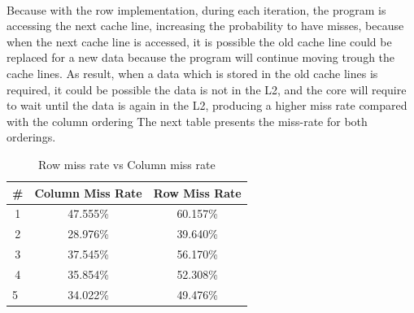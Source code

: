 \documentclass[xcolor=table]{llncs}
\begin{document}
\paragraph{}
Because with the row implementation, during each iteration, the program is accessing the next cache line, increasing the probability to have misses, because when the next cache line is accessed, it is possible the old cache line could be replaced for a new data because the program will continue moving trough the cache lines. As result, when a data which is stored in the old cache lines is required, it could be possible the data is not in the L2, and the core will require to wait until the data is again in the L2, producing a higher miss rate compared with the column ordering\newline
The next table presents the miss-rate for both orderings.
\begin{table}[]
\centering
\caption{Row miss rate vs Column miss rate}
\label{table4}
\begin{tabular}{ccc}
\hline
\rowcolor[HTML]{000000} 
{\color[HTML]{FFFFFF} \textbf{\#}} & {\color[HTML]{FFFFFF} \textbf{Column Miss Rate}} & {\color[HTML]{FFFFFF} \textbf{Row Miss Rate}} \\ \hline
1                                  & 47.555\%                                         & 60.157\%                                      \\
2                                  & 28.976\%                                         & 39.640\%                                      \\
3                                  & 37.545\%                                         & 56.170\%                                      \\
4                                  & 35.854\%                                         & 52.308\%                                      \\
\multicolumn{1}{l}{5}              & 34.022\%                                         & 49.476\%                                      \\ \hline
\end{tabular}
\end{table}
\newline
\newline
\newline
\end{document}
